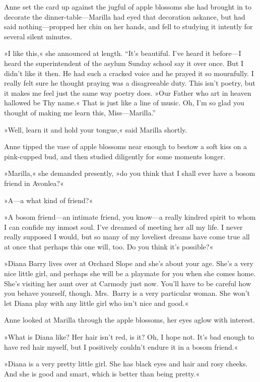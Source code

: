 Anne set the card up against the jugful of apple blossoms she had brought in to decorate the dinner-table—Marilla had eyed that decoration askance, but had said nothing—propped her chin on her hands, and fell to studying it intently for several silent minutes.

»I like this,« she announced at length. “It's beautiful. I've heard it before—I heard the superintendent of the asylum Sunday school say it over once. But I didn't like it then. He had such a cracked voice and he prayed it so mournfully. I really felt sure he thought praying was a disagreeable duty. This isn't poetry, but it makes me feel just the same way poetry does. »Our Father who art in heaven hallowed be Thy name.« That is just like a line of music. Oh, I'm so glad you thought of making me learn this, Miss—Marilla.”

»Well, learn it and hold your tongue,« said Marilla shortly.

Anne tipped the vase of apple blossoms near enough to bestow a soft kiss on a pink-cupped bud, and then studied diligently for some moments longer.

»Marilla,« she demanded presently, »do you think that I shall ever have a bosom friend in Avonlea?«

»A—a what kind of friend?«

»A bosom friend—an intimate friend, you know—a really kindred spirit to whom I can confide my inmost soul. I've dreamed of meeting her all my life. I never really supposed I would, but so many of my loveliest dreams have come true all at once that perhaps this one will, too. Do you think it's possible?«

»Diana Barry lives over at Orchard Slope and she's about your age. She's a very nice little girl, and perhaps she will be a playmate for you when she comes home. She's visiting her aunt over at Carmody just now. You'll have to be careful how you behave yourself, though. Mrs.~Barry is a very particular woman. She won't let Diana play with any little girl who isn't nice and good.«

Anne looked at Marilla through the apple blossoms, her eyes aglow with interest.

»What is Diana like? Her hair isn't red, is it? Oh, I hope not. It's bad enough to have red hair myself, but I positively couldn't endure it in a bosom friend.«

»Diana is a very pretty little girl. She has black eyes and hair and rosy cheeks. And she is good and smart, which is better than being pretty.«

